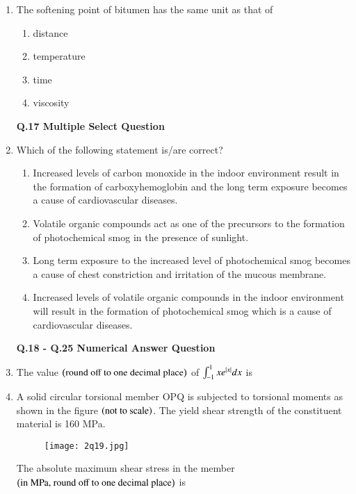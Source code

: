 \documentclass[journal,12pt,onecolumn]{article}
\theoremstyle{remark}
\begin{document}
\begin{enumerate}
\item The softening point of bitumen has the same unit as that of

\hfill{}

\begin{multicols}{2}
\begin{enumerate}
    \item distance
    \item temperature
    \item time
    \item viscosity
\end{enumerate}
\end{multicols}

\textbf{ Q.17 Multiple Select Question }
\item Which of the following statement is/are correct?

\hfill{}

\begin{enumerate}
    \item Increased levels of carbon monoxide in the indoor environment result in the formation of carboxyhemoglobin and the long term exposure becomes a cause of cardiovascular diseases.
    \item Volatile organic compounds act as one of the precursors to the formation of photochemical smog in the presence of sunlight.
    \item Long term exposure to the increased level of photochemical smog becomes a cause of chest constriction and irritation of the mucous membrane.
    \item Increased levels of volatile organic compounds in the indoor environment will result in the formation of photochemical smog which is a cause of cardiovascular diseases.
\end{enumerate}

\textbf{Q.18 - Q.25 Numerical Answer Question }
\item The value $\left(\text{round off to one decimal place}\right)$ of $\int_{-1}^{1} x e^{\left\vert x\right\vert} dx$ is \underline{\hspace{2cm}}

\hfill{}

\item A solid circular torsional member OPQ is subjected to torsional moments as shown in the figure  $\left(\text{not to scale}\right)$. The yield shear strength of the constituent material is 160 MPa.
\begin{figure}[H]
    \centering
    \texttt{[image: 2q19.jpg]}
    \caption{}
    \label{fig:q19}
\end{figure}
The absolute maximum shear stress in the member $\left(\text{in MPa, round off to one decimal place}\right)$ is \underline{\hspace{2cm}}


\end{enumerate}
\end{document}
